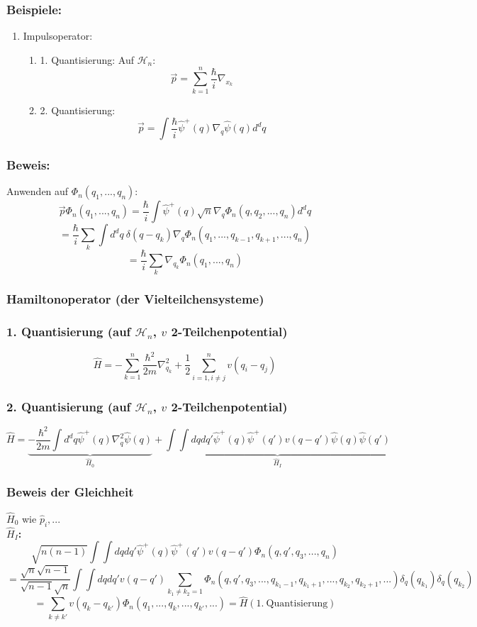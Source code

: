 \documentclass[twoside,a4paper]{scrartcl}
\renewcommand{\1}{\mathds{1}}
\renewcommand{\H}{\mathcal{H}}
\begin{document}
\subsubsection*{Beispiele:}
\begin{enumerate}
\item Impulsoperator:
\begin{enumerate}
\item 1. Quantisierung: Auf $\H_n$: $$\vec p=\sum_{k=1}^n \frac{\hbar}{i} \nabla_{x_k}$$
\item 2. Quantisierung: $$\vec p=\int \frac{\hbar}{i} \hat \psi^+(q) \nabla_q \hat \psi(q) d^dq$$
\end{enumerate}
\end{enumerate}
\subsubsection*{Beweis:}
Anwenden auf $\Phi_n(q_1,...,q_n)$:\\
$$\vec p \Phi_n(q_1,...,q_n)=\frac{\hbar}{i} \int \hat \psi^+(q) \sqrt{n} \nabla_q \Phi_n(q,q_2,...,q_n) d^dq$$
$$=\frac{\hbar}{i} \sum_k \int d^dq \ \delta(q-q_k) \nabla_q \Phi_n(q_1,...,q_{k-1},q_{k+1},...,q_n) $$
$$=\frac{\hbar}{i} \sum_k  \nabla_{q_k} \Phi_n(q_1,...,q_n) $$
\subsubsection*{Hamiltonoperator (der Vielteilchensysteme)}
\subsubsection*{1. Quantisierung (auf $\H_n$, $v$ 2-Teilchenpotential)}
$$\hat H=-\sum_{k=1}^n \frac{\hbar^2}{2m} \nabla^2_{q_k}+\frac{1}{2}\sum_{i=1,i\neq j}^n v(q_i-q_j)$$
\subsubsection*{2. Quantisierung (auf $\H_n$, $v$ 2-Teilchenpotential)}
$$\hat H=\underbrace{-\frac{\hbar^2}{2m}\int d^dq \hat \psi^+(q)  \nabla_{q}^2 \hat \psi(q)}_{\hat H_0}+\underbrace{\int \int dq dq' \hat \psi^+(q) \hat \psi^+(q') v(q-q')\hat \psi(q) \hat \psi(q') }_{\hat H_I}$$
\subsubsection*{Beweis der Gleichheit}
$\hat H_0$ wie $\hat p_i,...$\\
\textbf{$\hat H_I$:}\\
$$\sqrt{n(n-1)} \int \int dq dq' \hat \psi^+(q) \hat \psi^+(q') v(q-q') \Phi_n(q,q',q_3,...,q_n)$$
$$=\frac{\sqrt{n}\sqrt{n-1}}{\sqrt{n-1}\sqrt{n}}\int \int dq dq'  v(q-q') \sum_{k_1\neq k_2=1} \Phi_n(q,q',q_3,...,q_{k_1-1},q_{k_1+1},...,q_{k_2},q_{k_2+1},...) \delta_q(q_{k_1})\delta_q(q_{k_2})$$
$$=\sum_{k\neq k'} v(q_k-q_{k'})\Phi_n(q_1,...,q_k,...,q_{k'},...)=\hat H(1. \ \mathrm{Quantisierung})$$
\end{document}
